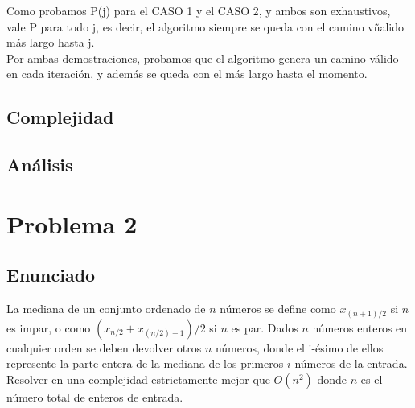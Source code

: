 \documentclass{article}
\theoremstyle{definition}
\theoremstyle{remark}
\begin{document}
Como probamos P(j) para el CASO 1 y el CASO 2, y ambos son exhaustivos, vale P para todo j, es decir, el algoritmo siempre se queda con el camino vñalido más largo hasta j. \\

Por ambas demostraciones, probamos que el algoritmo genera un camino válido en cada iteración, y además se queda con el más largo hasta el momento. \\


\subsection{Complejidad}

\subsection{Análisis}

\section{Problema 2}

\subsection{Enunciado}

La mediana de un conjunto ordenado de $n$ números se define como $x_{(n+1)/2}$ si $n$ es impar, o como $(x_{n/2} + x_{(n/2)+1})/2$ si $n$ es par. Dados $n$ números enteros en cualquier orden se deben devolver otros $n$ números, donde el i-ésimo de ellos represente la parte entera de la mediana de los primeros $i$ números de la entrada.
Resolver en una complejidad estrictamente mejor que $O(n^2)$ donde $n$ es el número total de enteros de entrada.
\end{document}
